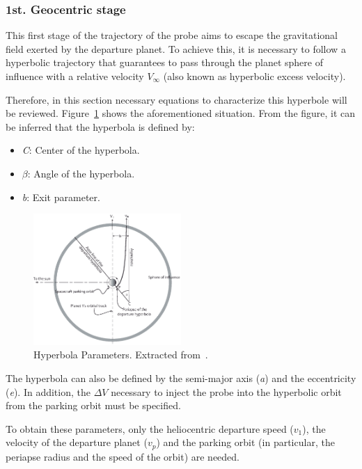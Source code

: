 \subsubsection{1st. Geocentric stage }
This first stage of the trajectory of the probe aims to escape the gravitational field exerted by the departure planet. To achieve this, it is necessary to follow a hyperbolic trajectory that guarantees to pass through the planet sphere of influence with a relative velocity $V_\infty$ (also known as hyperbolic excess velocity).

Therefore, in this section necessary equations to characterize this hyperbole will be reviewed. Figure~\ref{fig:HyperParam} shows the aforementioned situation. From the figure, it can be inferred that the hyperbola is defined by:
\begin{itemize}
	\item \textit{C}: Center of the hyperbola.
	\item $\beta$: Angle of the hyperbola.
	\item \textit{b}: Exit parameter.
\end{itemize} 

\begin{figure}[H]
	\centering
	\includegraphics[width=0.5\textwidth]{././images/1stStage1} 
	\caption{Hyperbola Parameters. Extracted from~\cite{llibreVictor}.}
	\label{fig:HyperParam}
\end{figure}

The hyperbola can also be defined by the semi-major axis (\textit{a}) and the eccentricity (\textit{e}). In addition, the $\Delta V$ necessary to inject the probe into the hyperbolic orbit from the parking orbit must be specified.

To obtain these parameters, only the heliocentric departure speed ($v_1$), the velocity of the departure planet ($v_p$) and the parking orbit (in particular, the periapse radius and the speed of the orbit) are needed.


